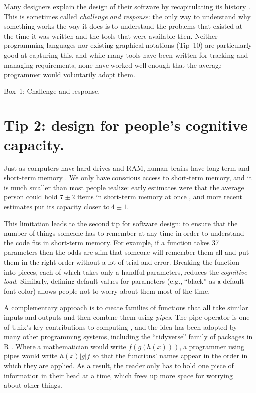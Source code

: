 \documentclass[10pt,letterpaper]{article}
\begin{document}
\begin{mdframed}
  \noindent
  Many designers explain the design of their software
  by recapitulating its history \cite{Brown2011,Brown2012}.
  This is sometimes called \emph{challenge and response}:
  the only way to understand why something works the way it does
  is to understand the problems that existed at the time it was written
  and the tools that were available then.
  Neither programming languages nor existing graphical notations (Tip~10)
  are particularly good at capturing this,
  and while many tools have been written for tracking and managing requirements,
  none have worked well enough that the average programmer would voluntarily adopt them.

  \noindent
  \colorbox{green!30}{Box~1: Challenge and response.}
\end{mdframed}

\section*{Tip 2: design for people's cognitive capacity.}

Just as computers have hard drives and RAM,
human brains have long-term and short-term memory \cite{Hermans2021}.
We only have conscious access to short-term memory,
and it is much smaller than most people realize:
early estimates were that the average person could hold
$7{\pm}2$ items in short-term memory at once \cite{Miller1956},
and more recent estimates put its capacity closer to $4{\pm}1$.

This limitation leads to the second tip for software design:
to ensure that the number of things someone has to remember at any time
in order to understand the code
fits in short-term memory.
For example,
if a function takes 37 parameters
then the odds are slim
that someone will remember them all and put them in the right order
without a lot of trial and error.
Breaking the function into pieces,
each of which takes only a handful parameters,
reduces the \emph{cognitive load}.
Similarly,
defining default values for parameters
(e.g., ``black'' as a default font color)
allows people not to worry about them most of the time.

A complementary approach is to create families of functions
that all take similar inputs and outputs
and then combine them using \emph{pipes}.
The pipe operator is one of Unix's key contributions to computing \cite{Kernighan2019},
and the idea has been adopted by many other programming systems,
including the ``tidyverse'' family of packages in R \cite{Wickham2017}.
Where a mathematician would write $f(g(h(x)))$,
a programmer using pipes would write $h(x) | g | f$
so that the functions' names appear in the order in which they are applied.
As a result,
the reader only has to hold one piece of information in their head at a time,
which frees up more space for worrying about other things.
\end{document}
